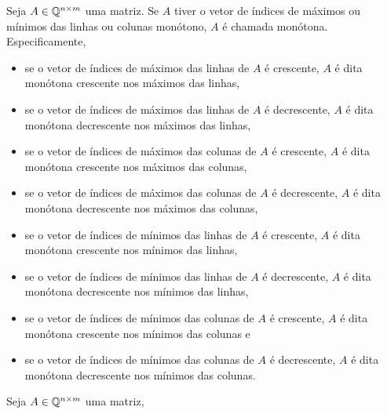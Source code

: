 \begin{defi}
Seja $A \in \mathbb{Q}^{n \times m}$ uma matriz. Se $A$ tiver o vetor de índices de máximos ou mínimos das linhas ou colunas monótono, $A$ é chamada monótona. Especificamente,
    \begin{itemize}
        \item se o vetor de índices de máximos das linhas de $A$ é crescente, $A$ é dita monótona crescente nos máximos das linhas,
        \item se o vetor de índices de máximos das linhas de $A$ é decrescente, $A$ é dita monótona decrescente nos máximos das linhas,
        \item se o vetor de índices de máximos das colunas de $A$ é crescente, $A$ é dita monótona crescente nos máximos das colunas,
        \item se o vetor de índices de máximos das colunas de $A$ é decrescente, $A$ é dita monótona decrescente nos máximos das colunas,
        \item se o vetor de índices de mínimos das linhas de $A$ é crescente, $A$ é dita monótona crescente nos mínimos das linhas,
        \item se o vetor de índices de mínimos das linhas de $A$ é decrescente, $A$ é dita monótona decrescente nos mínimos das linhas,
        \item se o vetor de índices de mínimos das colunas de $A$ é crescente, $A$ é dita monótona crescente nos mínimos das colunas e 
        \item se o vetor de índices de mínimos das colunas de $A$ é decrescente, $A$ é dita monótona decrescente nos mínimos das colunas.
    \end{itemize}
\end{defi}

\begin{defi}
Seja $A \in \mathbb{Q}^{n \times m}$ uma matriz,
\end{defi}
